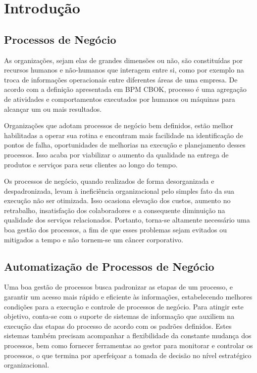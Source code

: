 \chapter{Introdução}\label{chp:introducao}

\section{Processos de Negócio}\label{sec:introducao-processos_negocio}

As organizações, sejam elas de grandes dimensões ou não, são constituídas por recursos humanos e não-humanos que interagem entre si, como por exemplo na troca de informações operacionais entre diferentes áreas de uma empresa. De acordo com a definição apresentada em BPM CBOK\cite{bpm_cbok}, processo é uma agregação de atividades e comportamentos executados por humanos ou máquinas para alcançar um ou mais resultados.

Organizações que adotam processos de negócio bem definidos, estão melhor habilitadas a operar sua rotina e encontram mais facilidade na identificação de pontos de falha, oportunidades de melhorias na execução e planejamento desses processos. Isso acaba por viabilizar o aumento da qualidade na entrega de produtos e serviços para seus clientes ao longo do tempo.

Os processos de negócio, quando realizados de forma desorganizada e despadronizada, levam à ineficiência organizacional pelo simples fato da sua execução não ser otimizada. Isso ocasiona elevação dos custos, aumento no retrabalho, insatisfação dos colaboradores e a consequente diminuição na qualidade dos serviços relacionados. Portanto, torna-se altamente necessário uma boa gestão dos processos, a fim de que esses problemas sejam evitados ou mitigados a tempo e não tornem-se um câncer corporativo. 

\section{Automatização de Processos de Negócio}\label{sec:introducao-automatizacao}

Uma boa gestão de processos busca padronizar as etapas de um processo, e garantir um acesso mais rápido e eficiente às informações, estabelecendo melhores condições para a execução e controle de processos de negócio. Para atingir este objetivo, conta-se com o suporte de sistemas de informação que auxiliem na execução das etapas do processo de acordo com os padrões definidos. Estes sistemas também precisam acompanhar a flexibilidade da constante mudança dos processos, bem como fornecer ferramentas ao gestor para monitorar e controlar os processos, o que termina por aperfeiçoar a tomada de decisão no nível estratégico organizacional.

